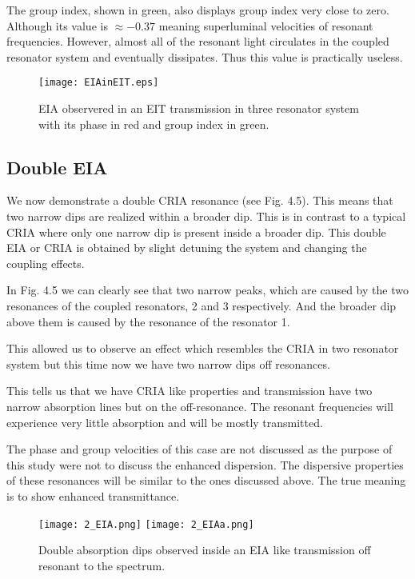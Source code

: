 The group index, shown in green, also displays group index very close to zero. Although its value is $\approx -0.37$ meaning superluminal velocities of resonant frequencies. However, almost all of the resonant light circulates in the coupled resonator system and eventually dissipates. Thus this value is practically useless.

\begin{figure}[t]
\centering
\texttt{[image: EIAinEIT.eps]}
\caption{EIA observered in an EIT transmission in three resonator system with its phase in red and group index in green.}
\end{figure}

\subsection{Double EIA}
We now demonstrate a double CRIA resonance (see Fig. 4.5). This means that two narrow dips are realized within a broader dip. This is in contrast to a typical CRIA where only one narrow dip is present inside a broader dip. This double EIA or CRIA is obtained by slight detuning the system and changing the coupling effects. 

In Fig. 4.5 we can clearly see that two narrow peaks, which are caused by the two resonances of the coupled resonators, 2 and 3 respectively. And the broader dip above them is caused by the resonance of the resonator 1. 


This allowed us to observe an effect which resembles the CRIA in two resonator system but this time now we have two narrow dips off resonances.

This tells us that we have CRIA like properties and transmission have two narrow absorption lines but on the off-resonance. The resonant frequencies will experience very little absorption and will be mostly transmitted. 

The phase and group velocities of this case are not discussed as the purpose of this study were not to discuss the enhanced dispersion. The dispersive properties of these resonances will be similar to the ones discussed above. The true meaning is to show enhanced transmittance.


\begin{figure}[t]
\centering
\texttt{[image: 2\_EIA.png]}
\texttt{[image: 2\_EIAa.png]}
\caption{Double absorption dips observed inside an EIA like transmission off resonant to the spectrum.}
\end{figure}


